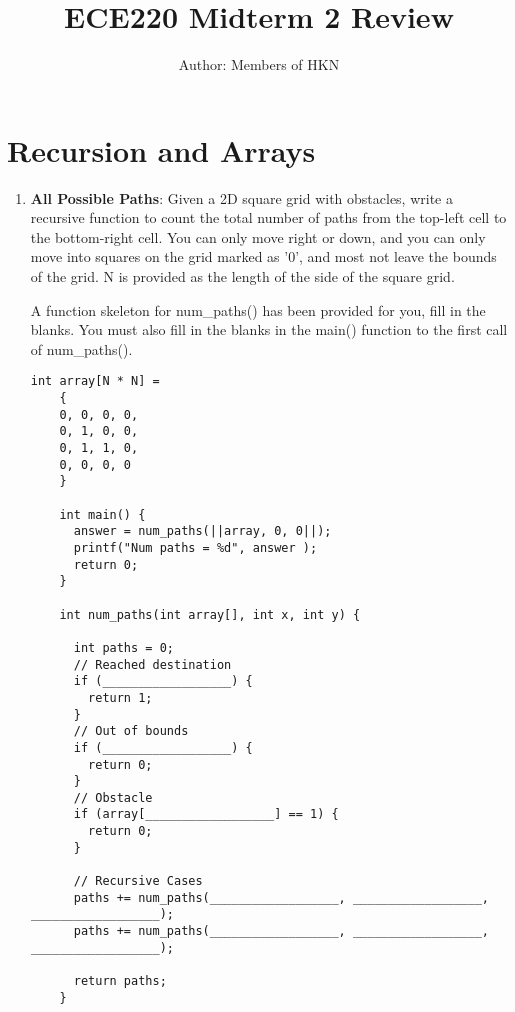 \documentclass{article}
\title{ECE220 Midterm 2 Review}
\author{Author: Members of HKN}
\date{}
\begin{document}
\maketitle

\section{
    Recursion and Arrays
}

\begin{enumerate}[label=(\alph*), itemsep = 120pt]
    \item \textbf{All Possible Paths}: Given a 2D square grid with obstacles, write a recursive function to count the total number of paths from the top-left cell to the bottom-right cell. You can only move right or down, and you can only move into squares on the grid marked as '0', and most not leave the bounds of the grid. N is provided as the length of the side of the square grid.
    
    A function skeleton for num\_paths() has been provided for you, fill in the blanks. You must also fill in the blanks in the main() function to the first call of num\_paths().

    \begin{lstlisting}[style=CStyle]
    int array[N * N] = 
    {
    0, 0, 0, 0,
    0, 1, 0, 0,
    0, 1, 1, 0,
    0, 0, 0, 0 
    }
    
    int main() {
      answer = num_paths(||array, 0, 0||);
      printf("Num paths = %d", answer );
      return 0;
    }
    
    int num_paths(int array[], int x, int y) {
      
      int paths = 0;
      // Reached destination
      if (__________________) {
        return 1;
      }
      // Out of bounds
      if (__________________) {
        return 0;
      }
      // Obstacle
      if (array[__________________] == 1) {
        return 0;
      }
      
      // Recursive Cases
      paths += num_paths(__________________, __________________, __________________);
      paths += num_paths(__________________, __________________, __________________);
    
      return paths;
    } \end{lstlisting}



\end{enumerate}
\end{document}
